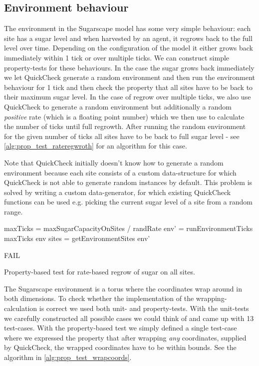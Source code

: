 \subsection{Environment behaviour}
The environment in the Sugarscape model has some very simple behaviour: each site has a sugar level and when harvested by an agent, it regrows back to the full level over time. Depending on the configuration of the model it either grows back immediately within 1 tick or over multiple ticks. We can construct simple property-tests for these behaviours. In the case the sugar grows back immediately we let QuickCheck generate a random environment and then run the environment behaviour for 1 tick and then check the property that all sites have to be back to their maximum sugar level. In the case of regrow over multiple ticks, we also use QuickCheck to generate a random environment but additionally a random \textit{positive} rate (which is a floating point number) which we then use to calculate the number of ticks until full regrowth. After running the random environment for the given number of ticks all sites have to be back to full sugar level - see \ref{alg:prop_test_rateregwroth} for an algorithm for this case.

Note that QuickCheck initially doesn't know how to generate a random environment because each site consists of a custom data-structure for which QuickCheck is not able to generate random instances by default. This problem is solved by writing a custom data-generator, for which existing QuickCheck functions can be used e.g. picking the current sugar level of a site from a random range.

\begin{algorithm}
maxTicks = maxSugarCapacityOnSites / randRate\;
env' = runEnvironmentTicks maxTicks env\;
sites = getEnvironmentSites env'\;

 {
  FAIL\;
}
\caption{Property-based test for rate-based regrow of sugar on all sites.}
\end{algorithm}
\label{alg:prop_test_rateregwroth}

The Sugarscape environment is a torus where the coordinates wrap around in both dimensions. To check whether the implementation of the wrapping-calculation is correct we used both unit- and property-tests. With the unit-tests we carefully constructed all possible cases we could think of and came up with 13 test-cases. With the property-based test we simply defined a single test-case where we expressed the property that after wrapping \textit{any} coordinates, supplied by QuickCheck, the wrapped coordinates have to be within bounds. See the algorithm in \ref{alg:prop_test_wrapcoords}.

